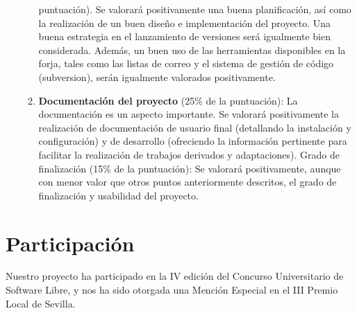 \begin{enumerate}
\begin{enumerate}
    puntuación). Se valorará positivamente una buena planificación, así como la
    realización de un buen diseño e implementación del proyecto. Una buena
    estrategia en el lanzamiento de versiones será igualmente bien considerada.
    Además, un buen uso de las herramientas disponibles en la forja, tales como
    las listas de correo y el sistema de gestión de código (subversion), serán
    igualmente valorados positivamente.
    \item {\bf Documentación del proyecto} (25\% de la puntuación): La
    documentación es un aspecto importante. Se valorará positivamente la
    realización de documentación de usuario final (detallando la instalación y
    configuración) y de desarrollo (ofreciendo la información pertinente para
    facilitar la realización de trabajos derivados y adaptaciones).
    Grado de finalización (15\% de la puntuación): Se valorará positivamente,
    aunque con menor valor que otros puntos anteriormente descritos, el grado de
    finalización y usabilidad del proyecto.
    \end{enumerate}
\end{enumerate}

\section{Participación}

Nuestro proyecto ha participado en la IV edición del Concurso Universitario de
Software Libre, y nos ha sido otorgada una Mención Especial en el III Premio
Local de Sevilla.